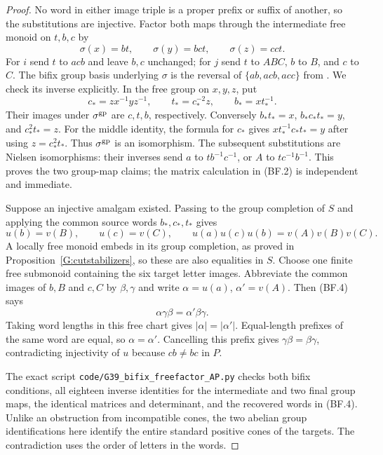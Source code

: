 \begin{proof}
No word in either image triple is a proper prefix or suffix
of another, so the substitutions are injective. Factor both
maps through the intermediate free monoid on $t,b,c$ by
\[
 \sigma(x)=bt,\qquad\sigma(y)=bct,\qquad\sigma(z)=cct.
\]
For $i$ send $t$ to $acb$ and leave $b,c$ unchanged; for
$j$ send $t$ to $ABC$, $b$ to $B$, and $c$ to $C$.
The bifix group basis underlying $\sigma$ is the reversal of
$\{ab,acb,acc\}$ from
\citet[Example~5.18]{GBerthe2015Bifix}. We check its inverse
explicitly. In the free group on $x,y,z$, put
\[
 c_*=zx^{-1}yz^{-1},\qquad
 t_*=c_*^{-2}z,\qquad b_*=xt_*^{-1}.
 \tag{BF.3}
\]
Their images under $\sigma^{\mathrm{gp}}$ are $c,t,b$, respectively.
Conversely $b_*t_*=x$, $b_*c_*t_*=y$, and
$c_*^2t_*=z$. For the middle identity, the formula for $c_*$
gives $x t_*^{-1}c_*t_*=y$ after using $z=c_*^2t_*$.
Thus $\sigma^{\mathrm{gp}}$ is an isomorphism. The subsequent
substitutions are Nielsen isomorphisms: their inverses send
$a$ to $t b^{-1}c^{-1}$, or $A$ to $t c^{-1}b^{-1}$.
This proves the two group-map claims; the matrix calculation
in (BF.2) is independent and immediate.

Suppose an injective amalgam existed. Passing to the group
completion of $S$ and applying the common source words
$b_*,c_*,t_*$ gives
\[
 u(b)=v(B),\qquad u(c)=v(C),\qquad
 u(a)u(c)u(b)=v(A)v(B)v(C).
 \tag{BF.4}
\]
A locally free monoid embeds in its group completion, as
proved in Proposition~\ref{G:cutstabilizers}, so these are
also equalities in $S$. Choose one finite free submonoid
containing the six target letter images. Abbreviate the
common images of $b,B$ and $c,C$ by $\beta,\gamma$ and
write $\alpha=u(a)$, $\alpha'=v(A)$. Then (BF.4) says
\[
 \alpha\gamma\beta=\alpha'\beta\gamma.
\]
Taking word lengths in this free chart gives
$|\alpha|=|\alpha'|$. Equal-length prefixes of the same
word are equal, so $\alpha=\alpha'$. Cancelling this prefix
gives $\gamma\beta=\beta\gamma$, contradicting injectivity
of $u$ because $cb\ne bc$ in $P$.

The exact script \texttt{code/G39\_bifix\_freefactor\_AP.py}
checks both bifix conditions, all eighteen inverse identities
for the intermediate and two final group maps, the identical
matrices and determinant, and the recovered words in (BF.4).
Unlike an obstruction from incompatible cones, the two
abelian group identifications here identify the entire
standard positive cones of the targets. The contradiction
uses the order of letters in the words.
\end{proof}

